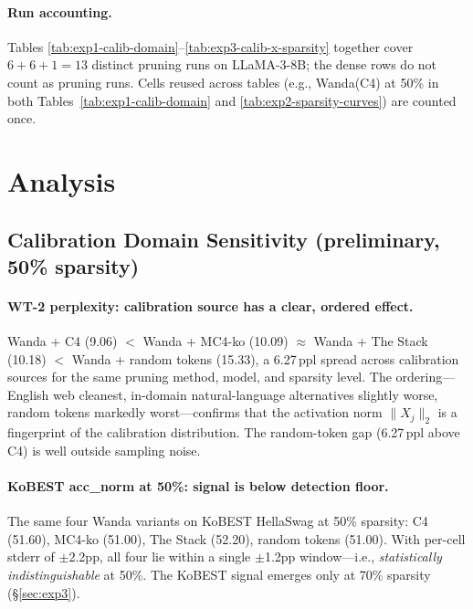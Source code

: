 \documentclass{article}
\begin{document}
\paragraph{Run accounting.}
Tables \ref{tab:exp1-calib-domain}--\ref{tab:exp3-calib-x-sparsity}
together cover $6 + 6 + 1 = 13$ distinct pruning runs on LLaMA-3-8B;
the dense rows do not count as pruning runs. Cells reused across
tables (e.g., Wanda(C4) at 50\% in both
Tables~\ref{tab:exp1-calib-domain} and \ref{tab:exp2-sparsity-curves})
are counted once.

\section{Analysis}

\subsection{Calibration Domain Sensitivity (preliminary, 50\% sparsity)}

\paragraph{WT-2 perplexity: calibration source has a clear, ordered effect.}
Wanda + C4 (9.06) $<$ Wanda + MC4-ko (10.09) $\approx$ Wanda + The Stack
(10.18) $<$ Wanda + random tokens (15.33), a 6.27\,ppl spread across
calibration sources for the same pruning method, model, and sparsity
level. The ordering---English web cleanest, in-domain natural-language
alternatives slightly worse, random tokens markedly worst---confirms
that the activation norm $\|X_j\|_2$ is a fingerprint of the calibration
distribution. The random-token gap (6.27\,ppl above C4) is well outside
sampling noise.

\paragraph{KoBEST acc\_norm at 50\%: signal is below detection floor.}
The same four Wanda variants on KoBEST HellaSwag at 50\% sparsity:
C4 (51.60), MC4-ko (51.00), The Stack (52.20), random tokens (51.00).
With per-cell stderr of $\pm$2.2pp, all four lie within a single
$\pm$1.2pp window---i.e., \emph{statistically indistinguishable} at
50\%. The KoBEST signal emerges only at 70\% sparsity
(\S\ref{sec:exp3}).
\end{document}
